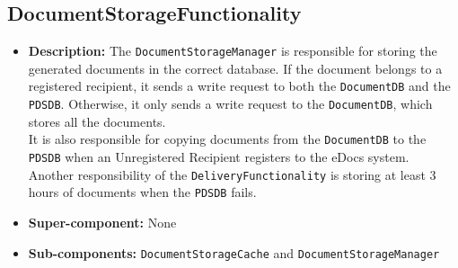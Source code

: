 \documentclass[a4paper,10pt]{article}
\begin{document}
\subsection{DocumentStorageFunctionality}
\begin{itemize}
    \item \textbf{Description:} The \texttt{DocumentStorageManager} is responsible for storing the generated documents in the correct database. If the document belongs to a registered recipient, it sends a write request to both the \texttt{DocumentDB} and the \texttt{PDSDB}. Otherwise, it only sends a write request to the \texttt{DocumentDB}, which stores all the documents.\\
    It is also responsible for copying documents from the \texttt{DocumentDB} to the \texttt{PDSDB} when an Unregistered Recipient registers to the eDocs system.\\ Another responsibility of the \texttt{DeliveryFunctionality} is storing at least 3 hours of documents when the \texttt{PDSDB} fails.
    \item \textbf{Super-component:} None
    \item \textbf{Sub-components:} \texttt{DocumentStorageCache} and \texttt{DocumentStorageManager}
\end{itemize}
\end{document}
